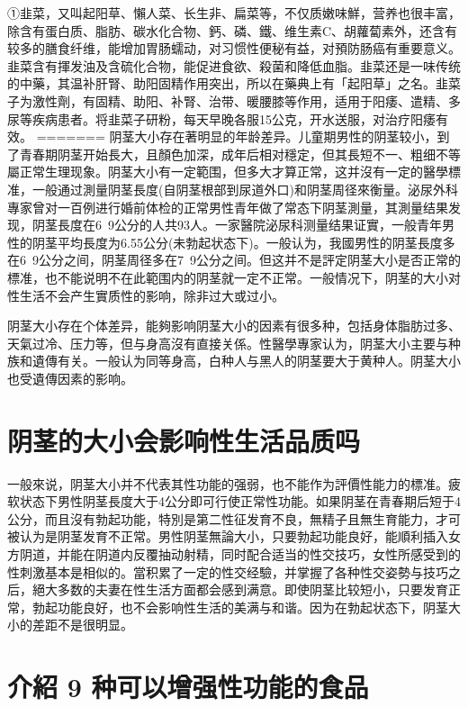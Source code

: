 \documentclass[12pt,UTF8]{ctexbook}
\begin{document}
①韭菜，又叫起阳草、懶人菜、长生非、扁菜等，不仅质嫩味鮮，营养也很丰富，除含有蛋白质、脂肪、碳水化合物、鈣、磷、鐵、维生素C、胡蘿蔔素外，还含有较多的膳食纤维，能增加胃肠蠕动，对习惯性便秘有益，对預防肠癌有重要意义。韭菜含有揮发油及含硫化合物，能促进食欲、殺菌和降低血脂。韭菜还是一味传统的中藥，其温补肝腎、助阳固精作用突出，所以在藥典上有「起阳草」之名。韭菜子为激性劑，有固精、助阳、补腎、治带、暖腰膝等作用，适用于阳痿、遣精、多尿等疾病患者。将韭菜子研粉，每天早晚各服15公克，开水送服，对治疗阳痿有效。
=======
阴茎大小存在著明显的年龄差异。儿童期男性的阴茎较小，到了青春期阴茎开始長大，且顏色加深，成年后相对穩定，但其長短不一、粗细不等屬正常生理现象。阴茎大小有一定範围，但多大才算正常，这并沒有一定的醫學標准，一般通过測量阴茎長度(自阴茎根部到尿道外口)和阴茎周径來衡量。泌尿外科專家曾对一百例进行婚前体检的正常男性青年做了常态下阴茎測量，其測量结果发现，阴茎長度在6~9公分的人共93人。一家醫院泌尿科测量结果证實，一般青年男性的阴茎平均長度为6.55公分(未勃起状态下)。一般认为，我國男性的阴茎長度多在6~9公分之间，阴茎周径多在7~9公分之间。但这并不是評定阴茎大小是否正常的標准，也不能说明不在此範围内的阴茎就一定不正常。一般情况下，阴茎的大小对性生活不会产生實质性的影响，除非过大或过小。

阴茎大小存在个体差异，能夠影响阴茎大小的因素有很多种，包括身体脂肪过多、天氣过冷、压力等，但与身高沒有直接关係。性醫學專家认为，阴茎大小主要与种族和遺傳有关。一般认为同等身高，白种人与黑人的阴茎要大于黄种人。阴茎大小也受遺傳因素的影响。

\section{阴茎的大小会影响性生活品质吗}

一般來说，阴茎大小并不代表其性功能的强弱，也不能作为評價性能力的標准。疲软状态下男性阴茎長度大于4公分即可行使正常性功能。如果阴茎在青春期后短于4公分，而且沒有勃起功能，特別是第二性征发育不良，無精子且無生育能力，才可被认为是阴茎发育不正常。男性阴茎無論大小，只要勃起功能良好，能順利插入女方阴道，并能在阴道内反覆抽动射精，同时配合适当的性交技巧，女性所感受到的性刺激基本是相似的。當积累了一定的性交经驗，并掌握了各种性交姿勢与技巧之后，絕大多数的夫妻在性生活方面都会感到满意。即使阴茎比较短小，只要发育正常，勃起功能良好，也不会影响性生活的美满与和谐。因为在勃起状态下，阴茎大小的差距不是很明显。

\section{介紹 9 种可以增强性功能的食品}
\end{document}
